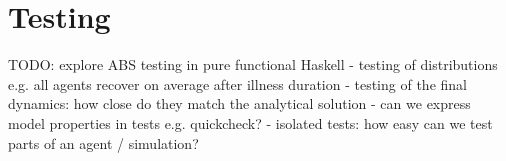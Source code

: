 \section{Testing}
TODO: explore ABS testing in pure functional Haskell
- testing of distributions e.g. all agents recover on average after illness duration
- testing of the final dynamics: how close do they match the analytical solution
- can we express model properties in tests e.g. quickcheck?
- isolated tests: how easy can we test parts of an agent / simulation?